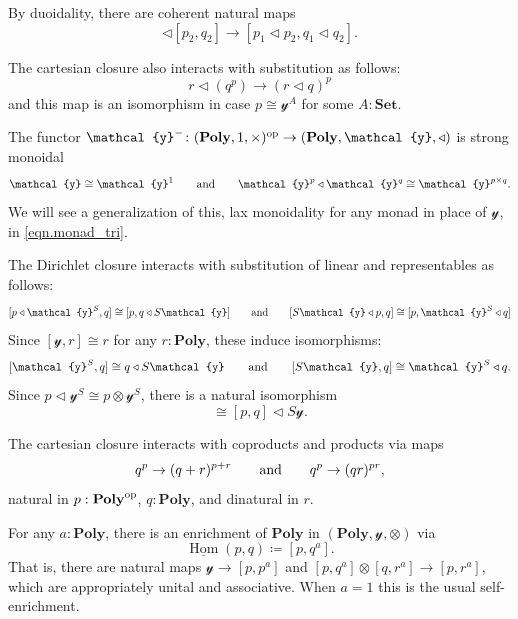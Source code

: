 \documentclass[11pt, one side, article]{memoir}
\theoremstyle{definition}
\theoremstyle{plain}
\DeclareMathOperator{\Hom}{Hom}
\newcommand{\Cat}[1]{\mathbf{#1}}%
\newcommand{\op}{^\tn{op}}
\newcommand{\tn}[1]{\textnormal{#1}}
\newcommand{\ul}[1]{\underline{#1}}
\newcommand{\smset}{\Cat{Set}}
\newcommand{\yon}{{\mathcal{y}}}
\newcommand{\poly}{\Cat{Poly}}
\newcommand{\0}{\textsf{0}}
\newcommand{\1}{\tn{\textsf{1}}}
\newcommand{\tri}{\mathbin{\triangleleft}}
\newcommand{\hh}[2][]{#1 \tn{#2} #1}
\newcommand{\qqand}{\hh[\qquad]{and}}
\begin{document}
By duoidality, there are coherent natural maps
\begin{equation}
	[p_1,q_1]\tri[p_2,q_2]\to[p_1\tri p_2,q_1\tri q_2].
\end{equation}

The cartesian closure also interacts with substitution as follows:
\begin{equation}
	r\tri (q^p)\to (r\tri q)^p
\end{equation}
and this map is an isomorphism in case $p\cong\yon^A$ for some $A:\smset$. 

The functor $\yon^-\colon(\poly,1,\times)\op\to(\poly,\yon,\tri)$ is strong monoidal
\begin{equation}
	\yon\cong\yon^1
	\qqand
	\yon^p\tri\yon^q\cong\yon^{p\times q}.
\end{equation}
We will see a generalization of this, lax monoidality for any monad in place of $\yon$, in \eqref{eqn.monad_tri}.

The Dirichlet closure interacts with substitution of linear and representables as follows:
\begin{equation}\label{eqn.innerhom_adj}
  [p\tri \yon^S,q]\cong[p,q\tri S\yon]
  \qqand
  [S\yon\tri p,q]\cong[p,\yon^S\tri q]
\end{equation}
Since $[\yon,r]\cong r$ for any $r:\poly$, these induce isomorphisms:
\begin{equation}\label{eqn.closure_lin_rep}
	[\yon^S,q]\cong q\tri S\yon
	\qqand
	[S\yon,q]\cong\yon^S\tri q.
\end{equation} 
Since $p\tri\yon^S\cong p\otimes\yon^S$, there is a natural isomorphism
\begin{equation}
[p,q\tri S\yon]\cong[p,q]\tri S\yon.
\end{equation}

The cartesian closure interacts with coproducts and products via maps
\begin{equation}
  q^p\to(q+r)^{p+r}
  \qqand
	q^p\to(qr)^{pr},
\end{equation}
natural in $p:\poly\op$, $q:\poly$, and dinatural in $r$.

For any $a:\poly$, there is an enrichment of $\poly$ in $(\poly,\yon,\otimes)$ via
\begin{equation}
	\ul\Hom(p,q)\coloneqq[p,q^a].
\end{equation}
That is, there are natural maps $\yon\to[p,p^a]$ and $[p,q^a]\otimes[q,r^a]\to[p,r^a]$, which are appropriately unital and associative. When $a=1$ this is the usual self-enrichment.
\end{document}

